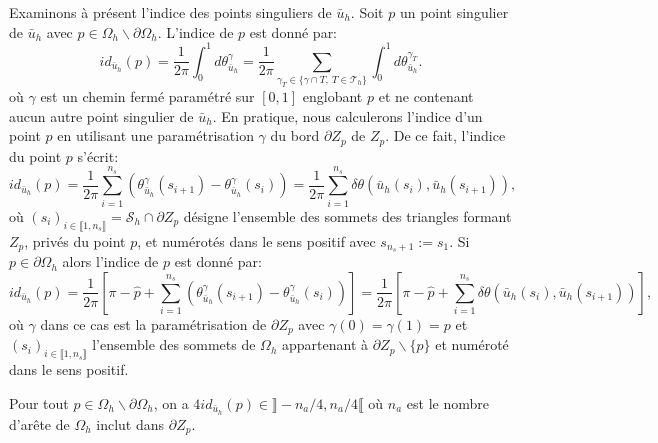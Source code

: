 Examinons à présent l'indice des points singuliers de $\bar{u}_h$. Soit $p$ un point singulier de $\bar{u}_h$ avec $p\in\Omega_h\backslash\partial\Omega_h$. L'indice de $p$ est donné par:
$$
id_{\bar{u}_h}(p)=\frac{1}{2\pi}\int_0^1 d\theta^\gamma_{\bar{u}_h}=\frac{1}{2\pi}\sum_{\gamma_T\in\{\gamma\cap T,~T\in\mathcal{T}_h\}}\int_0^1 d\theta^{\gamma_T}_{\bar{u}_h}.
$$
où $\gamma$ est un chemin fermé paramétré sur $[0, 1]$ englobant $p$ et ne contenant aucun autre point singulier de $\bar{u}_h$. En pratique, nous calculerons l'indice d'un point $p$ en utilisant une paramétrisation $\gamma$ du bord $\partial Z_p$ de $Z_p$. De ce fait, l'indice du point $p$ s'écrit:
\begin{equation}
    \label{eqn:ind_int}
    id_{\bar{u}_h}(p)=\displaystyle\frac{1}{2\pi}\displaystyle\sum_{i=1}^{n_s}\left(\theta^\gamma_{\bar{u}_h}(s_{i+1})-\theta^\gamma_{\bar{u}_h}(s_i)\right)=\displaystyle\frac{1}{2\pi}\sum_{i=1}^{n_s}\delta\theta(\bar{u}_h(s_i),\bar{u}_h(s_{i+1})),
\end{equation}
où $(s_i)_{i\in\llbracket 1, n_s\rrbracket}=\mathcal{S}_h\cap\partial Z_p$ désigne l'ensemble des sommets des triangles formant $Z_p$, privés du point $p$, et numérotés dans le sens positif avec $s_{n_s+1}:=s_1$.
Si $p\in\partial\Omega_h$ alors l'indice de $p$ est donné par:
\begin{equation}
    \label{eqn:ind_bord}
    id_{\bar{u}_h}(p)=\displaystyle\frac{1}{2\pi}\left[\pi-\widehat{p}+\displaystyle\sum_{i=1}^{n_s}\left(\theta^\gamma_{\bar{u}_h}(s_{i+1})-\theta^\gamma_{\bar{u}_h}(s_i)\right)\right]=\displaystyle\frac{1}{2\pi}\left[\pi-\widehat{p}+\displaystyle\sum_{i=1}^{n_s}\delta\theta(\bar{u}_h(s_i),\bar{u}_h(s_{i+1}))\right],
\end{equation}
où $\gamma$ dans ce cas est la paramétrisation de $\partial Z_p$ avec $\gamma(0)=\gamma(1)=p$ et $(s_i)_{i\in\llbracket 1, n_s\rrbracket}$ l'ensemble des sommets de $\Omega_h$ appartenant à $\partial Z_p\backslash\{p\}$ et numéroté dans le sens positif.

\begin{proposition}
    Pour tout $p\in\Omega_h\backslash\partial\Omega_h$, on a $4id_{\bar{u}_h}(p)\in\rrbracket -n_a/4, n_a/4\llbracket$ où $n_a$ est le nombre d'arête de $\Omega_h$ inclut dans $\partial Z_p$.
\end{proposition}

